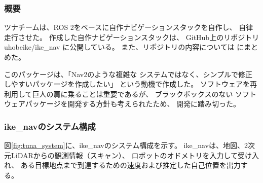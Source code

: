 \documentclass[twocolumn,9pt]{jsproceedings}
\begin{document}
\subsubsection{概要}
ツナチームは、ROS 2をベースに自作ナビゲーションスタックを自作し、
自律走行させた。
作成した自作ナビゲーションスタックは、
GitHub上のリポジトリuhobeike/ike\_nav\cite{ike_nav}
に公開している。
また、リポジトリの内容については
\cite{ike_nav_detail}にまとめた。

このパッケージは、「Nav2のような複雑な
システムではなく、シンプルで修正しやすいパッケージを作成したい」
という動機で作成した。
ソフトウェアを再利用して巨人の肩に乗ることは重要であるが、
ブラックボックスのない
ソフトウェアパッケージを開発する方針も考えられたため、
開発に踏み切った。



%


\subsubsection{ike\_navのシステム構成}

図\ref{fig:tuna_system}に、ike\_navのシステム構成を示す。
ike\_navは、地図、2次元LiDARからの観測情報（スキャン）、
ロボットのオドメトリを入力して受け入れ、
ある目標地点まで到達するための速度および推定した自己位置を出力する。
\end{document}
